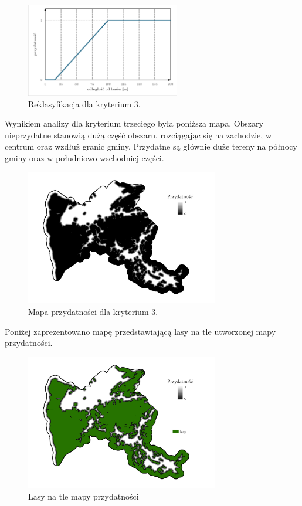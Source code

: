 \documentclass{article}
\begin{document}
\begin{figure}[H]
    \centering
    \includegraphics[width=0.6\textwidth]{img/kryterium3-wykres-glowny.png}
    \caption*{Reklasyfikacja dla kryterium 3.}
\end{figure}
\vspace{10pt}
Wynikiem analizy dla kryterium trzeciego była poniższa mapa.
Obszary nieprzydatne stanowią dużą część obszaru, rozciągając się na zachodzie, w centrum oraz wzdłuż granic gminy. Przydatne są głównie duże tereny na północy gminy oraz w południowo-wschodniej części.

\vspace{5pt}

\begin{figure}[H]
    \centering
    \includegraphics[width=0.75\textwidth]{img/kryterium3-layout.jpg}
    \caption{Mapa przydatności dla kryterium 3.}
\end{figure}
\vspace{10pt}

Poniżej zaprezentowano mapę przedstawiającą lasy na tle utworzonej mapy przydatności. 

\begin{figure}[H]
    \centering
    \includegraphics[width=0.75\textwidth]{img/kryterium3-lasy.jpg}
    \caption{Lasy na tle mapy przydatności}
\end{figure}
\vspace{10pt}
\end{document}
